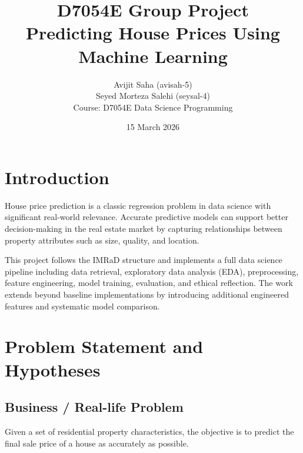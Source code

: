 \documentclass[a4paper]{article}
\title{D7054E Group Project \\
Predicting House Prices Using Machine Learning}
\author{
Avijit Saha (avisah-5) \\
Seyed Morteza Salehi (seysal-4) \\
Course: D7054E Data Science Programming
}
\date{15 March 2026}
\begin{document}
\maketitle


\section*{Introduction}

House price prediction is a classic regression problem in data science with significant real-world relevance. Accurate predictive models can support better decision-making in the real estate market by capturing relationships between property attributes such as size, quality, and location.

This project follows the IMRaD structure and implements a full data science pipeline including data retrieval, exploratory data analysis (EDA), preprocessing, feature engineering, model training, evaluation, and ethical reflection. The work extends beyond baseline implementations by introducing additional engineered features and systematic model comparison.

\section*{Problem Statement and Hypotheses}

\subsection*{Business / Real-life Problem}

Given a set of residential property characteristics, the objective is to predict the final sale price of a house as accurately as possible.
\end{document}
